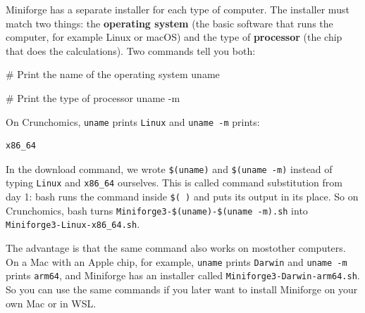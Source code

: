 \documentclass[
  letterpaper,
  DIV=11,
  numbers=noendperiod]{scrreprt}
\newenvironment{Shaded}{}{}
\newcommand{\AttributeTok}[1]{\textcolor[rgb]{0.84,0.23,0.29}{#1}}
\newcommand{\CommentTok}[1]{\textcolor[rgb]{0.42,0.45,0.49}{#1}}
\newcommand{\FunctionTok}[1]{\textcolor[rgb]{0.44,0.26,0.76}{#1}}
\begin{document}
\begin{tcolorbox}[enhanced jigsaw, colbacktitle=quarto-callout-tip-color!10!white, rightrule=.15mm, leftrule=.75mm, colback=white, opacitybacktitle=0.6, title=\textcolor{quarto-callout-tip-color}{\faLightbulb}\hspace{0.5em}{Tip: How \texttt{uname} picks the right installer (optional)}, bottomrule=.15mm, left=2mm, colframe=quarto-callout-tip-color-frame, opacityback=0, breakable, bottomtitle=1mm, coltitle=black, arc=.35mm, toprule=.15mm, toptitle=1mm, titlerule=0mm]

Miniforge has a separate installer for each type of computer. The
installer must match two things: the \textbf{operating system} (the
basic software that runs the computer, for example Linux or macOS) and
the type of \textbf{processor} (the chip that does the calculations).
Two commands tell you both:

\begin{Shaded}
\begin{Highlighting}[]
\CommentTok{\# Print the name of the operating system}
\FunctionTok{uname}

\CommentTok{\# Print the type of processor}
\FunctionTok{uname} \AttributeTok{{-}m}
\end{Highlighting}
\end{Shaded}

On Crunchomics, \texttt{uname} prints \texttt{Linux} and
\texttt{uname\ -m} prints:

\begin{verbatim}
x86_64
\end{verbatim}

In the download command, we wrote \texttt{\$(uname)} and
\texttt{\$(uname\ -m)} instead of typing \texttt{Linux} and
\texttt{x86\_64} ourselves. This is called command substitution from day
1: bash runs the command inside \texttt{\$(\ )} and puts its output in
its place. So on Crunchomics, bash turns
\texttt{Miniforge3-\$(uname)-\$(uname\ -m).sh} into
\texttt{Miniforge3-Linux-x86\_64.sh}.

The advantage is that the same command also works on mostother
computers. On a Mac with an Apple chip, for example, \texttt{uname}
prints \texttt{Darwin} and \texttt{uname\ -m} prints \texttt{arm64}, and
Miniforge has an installer called \texttt{Miniforge3-Darwin-arm64.sh}.
So you can use the same commands if you later want to install Miniforge
on your own Mac or in WSL.

\end{tcolorbox}
\end{document}
